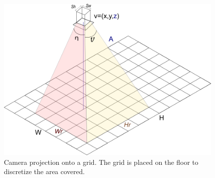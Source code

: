 	\begin{figure}[t!]
		\centering
  		\includegraphics[width=\linewidth]{img/CamProject1Bis.png}
  
 	 	\endminipage\hfill\caption{Camera projection onto a grid. The grid is placed on the floor to discretize 	the area covered.}\label{fig:cam_proj}
	\end{figure}



